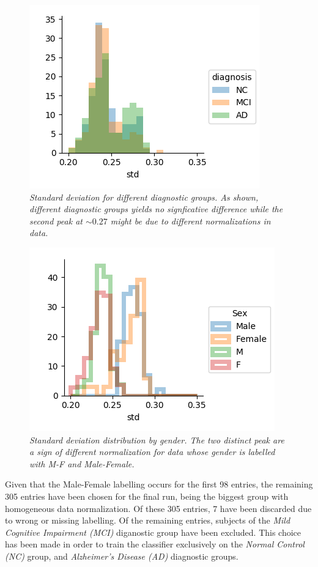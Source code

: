 \documentclass[12pt,openright,twoside,a4paper]{book}
\begin{document}
\begin{figure}[!h]
\centering
\includegraphics[scale=0.75]{std-ADNI}
\caption{\textit{Standard deviation for different diagnostic groups. As shown, different diagnostic groups yields no signficative difference while the second peak at $\sim 0.27$ might be due to different normalizations in data.}}
\label{std-ADNI}
\end{figure}

\begin{figure}[!h]
\centering
\includegraphics[scale=0.75]{ADNi-std-gen}
\caption{\textit{Standard deviation distribution by gender. The two distinct peak are a sign of different normalization for data whose gender is labelled with M-F and Male-Female.}}
\label{std-gen-ADNI}
\end{figure}

Given that the Male-Female labelling occurs for the first 98 entries, the remaining 305 entries have been chosen for the final run, being the biggest group with homogeneous data normalization.
Of these 305 entries, 7 have been discarded due to wrong or missing labelling.
Of the remaining entries, subjects of the \textit{Mild Cognitive Impairment (MCI)} diganostic group have been excluded.
This choice has been made in order to train the classifier exclusively on the \textit{Normal Control (NC)} group, and \textit{Alzheimer's Disease (AD)} diagnostic groups.
\end{document}
